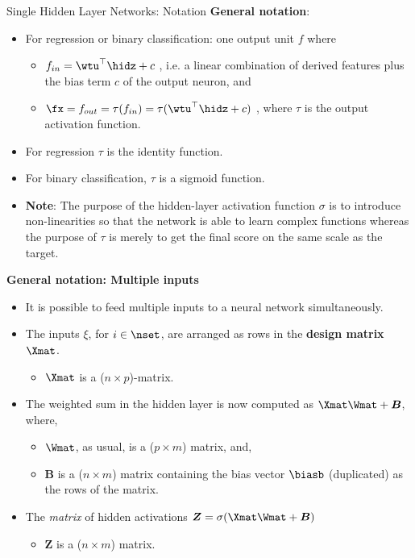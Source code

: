 \begin{vbframe}{Single Hidden Layer Networks: Notation}
  \textbf{General notation}:
  \begin{itemize}
    \vspace{4mm}
    \item For regression or binary classification: one output unit $f$ where
      \begin{itemize}
        \item $f_{in} = \wtu^\top \hidz + c$ , i.e. a linear combination of derived features plus the bias term $c$ of the output neuron, and
        \vspace{2mm}
        \item $\fx= f_{out} = \tau(f_{in}) = \tau(\wtu^\top \hidz + c)$ , where $\tau$ is the output activation function.
      \end{itemize}
    \item For regression $\tau$ is the identity function.
    \item For binary classification, $\tau$ is a sigmoid function.
    \item \textbf{Note}: The purpose of the hidden-layer activation function $\sigma$ is to introduce non-linearities so that the network is able to learn complex functions whereas the purpose of $\tau$ is merely to get the final score on the same scale as the target.
  \end{itemize}

\framebreak 

  \textbf{General notation: Multiple inputs}
  \begin{itemize}
    \item It is possible to feed multiple inputs to a neural network simultaneously.
    \vspace{2mm}
    \item The inputs $\xi$, for $i \in \nset$, are arranged as rows in the \textbf{design matrix} $\Xmat$.
    \begin{itemize}
      \item $\Xmat$ is a ($n \times p$)-matrix.
    \end{itemize}
    \vspace{2mm}
    \item The weighted sum in the hidden layer is now computed as $\Xmat\Wmat + \bm{B}$, where,
      \begin{itemize}
        \item $\Wmat$, as usual, is a ($p \times m$) matrix, and,
        \vspace{2mm}
        \item $\bm{B}$ is a ($n \times m$) matrix containing the bias vector $\biasb$ (duplicated) as the rows of the matrix.
      \end{itemize}
    \vspace{2mm}
    \item The \textit{matrix} of hidden activations $\bm{Z} = \sigma(\Xmat\Wmat + \bm{B})$
    \begin{itemize}
      \item $\bm{Z}$ is a ($n \times m$) matrix.
    \end{itemize}
  \end{itemize}


\end{vbframe}
